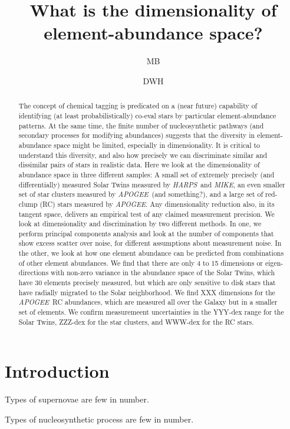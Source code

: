 \documentclass[letterpaper, modern]{aastex62}
\newcommand{\project}[1]{\textsl{#1}}
\newcommand{\acronym}[1]{{\small{#1}}}
\newcommand{\APOGEE}{\project{\acronym{APOGEE}}}
\newcommand{\HARPS}{\project{\acronym{HARPS}}}
\newcommand{\MIKE}{\project{\acronym{MIKE}}}
\begin{document}
\sloppy\sloppypar\raggedbottom\frenchspacing

\title{What is the dimensionality of element-abundance space?}
\author{MB}
\author{DWH}

\begin{abstract}
The concept of chemical tagging is predicated on a (near future) capability
of identifying (at least probabilistically) co-eval stars by particular
element-abundance patterns.
At the same time, the finite number of nucleosynthetic pathways (and secondary
processes for modifying abundances) suggests that the diversity in
element-abundance space might be limited, especially in dimensionality.
It is critical to understand this diversity, and also how precisely
we can discriminate similar and dissimilar pairs of stars in realistic data.
Here we look at the dimensionality of abundance space in three different
samples: A small set of extremely precisely (and differentially) measured
Solar Twins measured by \HARPS\ and \MIKE,
an even smaller set of star clusters measured by \APOGEE\ (and something?),
and a large set of red-clump (RC) stars measured by \APOGEE.
Any dimensionality reduction also, in its tangent space, delivers an empirical
test of any claimed measurement precision.
We look at dimensionality and discrimination by two different methods.
In one, we perform principal components analysis and look at the number of
components that show excess scatter over noise, for different assumptions about
measurement noise.
In the other, we look at how one element abundance can be predicted from combinations
of other element abundances.
We find that there are only 4 to 15 dimensions or eigen-directions with
non-zero variance in the abundance space of the Solar Twins,
which have 30 elements precisely measured, but which are only sensitive to disk
stars that have radially migrated to the Solar neighborhood.
We find XXX dimensions for the \APOGEE\ RC abundances, which are measured
all over the Galaxy but in a smaller set of elements.
We confirm measuremeent uncertainties in the YYY-dex range for the Solar Twins,
ZZZ-dex for the star clusters, and WWW-dex for the RC stars.
\end{abstract}

\section{Introduction}

Types of supernovae are few in number.

Types of nucleosynthetic process are few in number.
\end{document}
